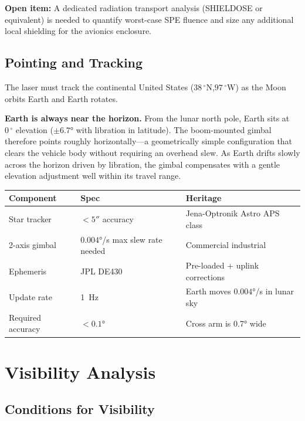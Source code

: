 \documentclass[12pt,letterpaper]{article}
\begin{document}
\noindent \textbf{Open item:} A dedicated radiation transport analysis
(SHIELDOSE or equivalent) is needed to quantify worst-case SPE fluence
and size any additional local shielding for the avionics enclosure.

\subsection{Pointing and Tracking}

The laser must track the continental United States
($38\,^\circ$N,\;$97\,^\circ$W) as the Moon orbits Earth and Earth rotates.

\textbf{Earth is always near the horizon.} From the lunar north pole, Earth sits
at $0\,^\circ$ elevation ($\pm\ang{6.7}$ with libration in latitude). The
boom-mounted gimbal therefore points roughly horizontally---a geometrically
simple configuration that clears the vehicle body without requiring an overhead
slew. As Earth drifts slowly across the horizon driven by libration, the gimbal
compensates with a gentle elevation adjustment well within its travel range.

\begin{center}
\begin{tabular}{lll}
\toprule
\textbf{Component} & \textbf{Spec} & \textbf{Heritage} \\
\midrule
Star tracker & $< \ang{;;5}$ accuracy & Jena-Optronik Astro APS class \\
2-axis gimbal & $\ang{0.004}$/s max slew rate needed & Commercial industrial \\
Ephemeris & JPL DE430 & Pre-loaded + uplink corrections \\
Update rate & \SI{1}{\hertz} & Earth moves $\ang{0.004}$/s in lunar sky \\
Required accuracy & $< \ang{0.1}$ & Cross arm is \ang{0.7} wide \\
\bottomrule
\end{tabular}
\end{center}

\section{Visibility Analysis}

\subsection{Conditions for Visibility}
\end{document}
